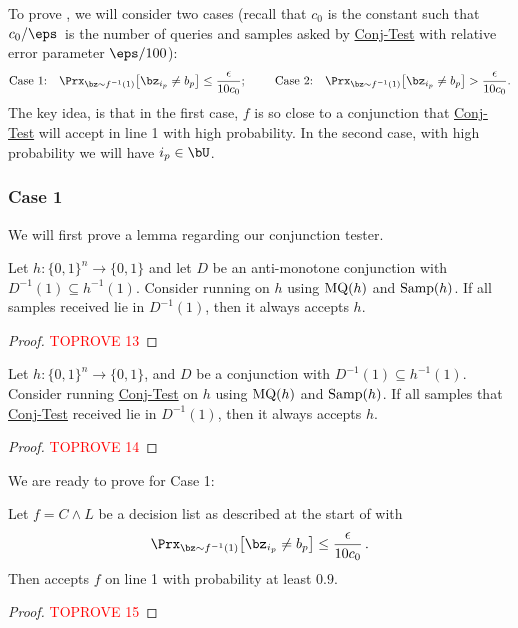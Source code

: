 \documentclass[11pt]{article}
\theoremstyle{definition}
\begin{document}
To prove , we will  consider two cases (recall that $c_0$ is the constant such that $c_0/\eps$~is the number of 
    queries and samples asked by \hyperlink{Algorithm2}{\sc Conj-Test} with relative error parameter $\eps/100$):
$$
\text{Case $1$:}\quad
\Prx_{\bz \sim f^{-1}(1)}\big[\bz_{i_p} \neq b_p\big] \leq \frac{\epsilon}{10c_0};
\qquad\text{ Case $2$:}\quad 
 \Prx_{\bz \sim f^{-1}(1)}\big[\bz_{i_p} \neq b_p\big] > \frac{\epsilon}{10c_0}.
$$
The key idea, is that in the first case, $f$ is so close to a conjunction that \hyperlink{Algorithm2}{\sc Conj-Test}
will accept in line 1 with high probability. In the second case, with high probability we will have $i_p \in \bU$. 

\subsubsection{Case 1}
We will first prove a lemma regarding our conjunction tester.


\begin{lemma}\label{lem:simple1}
    Let $h : \{0,1\}^n \to \{0,1\}$ and let $D$ be an anti-monotone conjunction with $D^{-1}(1)\subseteq h^{-1}(1)$. Consider running  on $h$ using $\mathrm{MQ}(h)$ and $\mathrm{Samp}(h)$. 
    If all samples  received lie in $D^{-1}(1)$, then it always accepts $h$.\end{lemma}
\begin{proof}\textcolor{red}{TOPROVE 13}\end{proof}

\begin{corollary}\label{lem:samples and query from conj}
    Let $h : \{0,1\}^n \to \{0,1\}$, and  $D$ be a  conjunction 
with $D^{-1}(1)\subseteq h^{-1}(1)$. Consider running \hyperlink{Algorithm2}{\sc Conj-Test}
on $h $ using $\mathrm{MQ}(h)$ and $\mathrm{Samp}(h)$.
If all samples that \hyperlink{Algorithm2}{\sc Conj-Test} received lie in $D^{-1}(1)$, then 
    it always
accepts $h$.
\end{corollary}
\begin{proof}\textcolor{red}{TOPROVE 14}\end{proof}

We are ready to prove  for Case 1:

\begin{lemma}\label{lem: f is a DL case 1}
    Let $f=C\land L$ be a decision list as described at the start of  with $$\Prx_{\bz \sim f^{-1}(1)}\big[\bz_{i_p} \neq b_p\big] \leq \frac{\epsilon}{10c_0}\,.$$ Then
     accepts $f$ on line 1 with probability at least $0.9$. \end{lemma}
\begin{proof}\textcolor{red}{TOPROVE 15}\end{proof}
\end{document}
